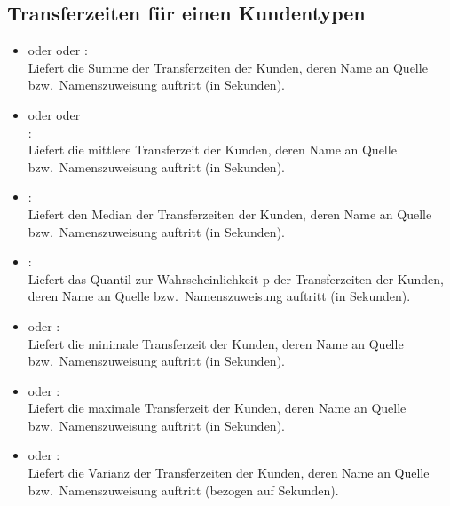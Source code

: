 \subsection{Transferzeiten für einen Kundentypen}

\begin{itemize}

\item
{} oder  oder :\\
Liefert die Summe der Transferzeiten der Kunden, deren Name an Quelle bzw.\ Namenszuweisung  auftritt (in Sekunden).

\item
{} oder  oder\\
:\\
Liefert die mittlere Transferzeit der Kunden, deren Name an Quelle bzw.\ Namenszuweisung  auftritt (in Sekunden).

\item
{}:\\
Liefert den Median der Transferzeiten der Kunden, deren Name an Quelle bzw.\ Namenszuweisung  auftritt (in Sekunden).

\item
{}:\\
Liefert das Quantil zur Wahrscheinlichkeit p der Transferzeiten der Kunden, deren Name an Quelle bzw.\ Namenszuweisung  auftritt (in Sekunden).

\item
{} oder :\\
Liefert die minimale Transferzeit der Kunden, deren Name an Quelle bzw.\ Namenszuweisung  auftritt (in Sekunden).

\item
{} oder :\\
Liefert die maximale Transferzeit der Kunden, deren Name an Quelle bzw.\ Namenszuweisung  auftritt (in Sekunden).

\item
{} oder :\\
Liefert die Varianz der Transferzeiten der Kunden, deren Name an Quelle bzw.\ Namenszuweisung  auftritt (bezogen auf Sekunden).


\end{itemize}
